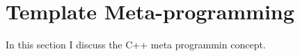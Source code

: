 \section{Template Meta-programming}
\label{sec:preliminaries:cpp}

In this section I discuss the C++ meta programmin concept.

\clearpage